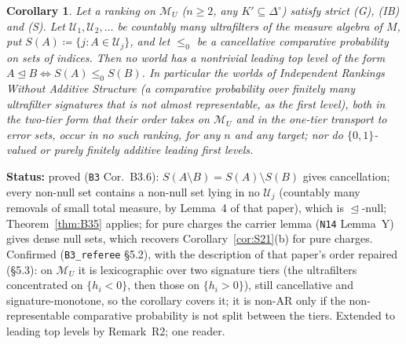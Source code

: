 \documentclass[11pt]{article}
\newtheorem{corollary}[theorem]{Corollary}
\theoremstyle{definition}
\theoremstyle{remark}
\newcommand{\Di}{\Delta^{\circ}}
\newcommand{\M}{\mathcal M}
\newcommand{\src}[1]{\texttt{#1}}
\newcommand{\status}[1]{\par\smallskip\noindent\textbf{Status:} #1\par\smallskip}
\begin{document}
\begin{corollary}\label{cor:B36}
Let a ranking on $\M_U$ ($n\ge2$, any $K'\subseteq\Di$) satisfy strict (G), (IB) and (S). Let $\mathcal U_1,\mathcal U_2,\dots$ be countably many ultrafilters of the measure algebra of $M$, put $S(A)\coloneqq\{j:A\in\mathcal U_j\}$, and let $\le_0$ be a cancellative comparative probability on sets of indices. Then no world has a nontrivial leading top level of the form $A\trianglelefteq B\iff S(A)\le_0S(B)$. In particular the worlds of \emph{Independent Rankings Without Additive Structure} (a comparative probability over finitely many ultrafilter signatures that is not almost representable, as the first level), both in the two-tier form that their order takes on $\M_U$ and in the one-tier transport to error sets, occur in no such ranking, for any $n$ and any target; nor do $\{0,1\}$-valued or purely finitely additive leading first levels.
\end{corollary}
\status{proved (\src{B3} Cor.~B3.6): $S(A\setminus B)=S(A)\setminus S(B)$ gives cancellation; every non-null set contains a non-null set lying in no $\mathcal U_j$ (countably many removals of small total measure, by Lemma~4 of that paper), which is $\trianglelefteq$-null; Theorem~\ref{thm:B35} applies; for pure charges the carrier lemma (\src{N14} Lemma~Y) gives dense null sets, which recovers Corollary~\ref{cor:S21}(b) for pure charges. Confirmed (\src{B3\_referee} \S5.2), with the description of that paper's order repaired (\S5.3): on $\M_U$ it is lexicographic over two signature tiers (the ultrafilters concentrated on $\{h_i<0\}$, then those on $\{h_i>0\}$), still cancellative and signature-monotone, so the corollary covers it; it is non-AR only if the non-representable comparative probability is not split between the tiers. Extended to leading top levels by Remark~R2; one reader.}
\end{document}
